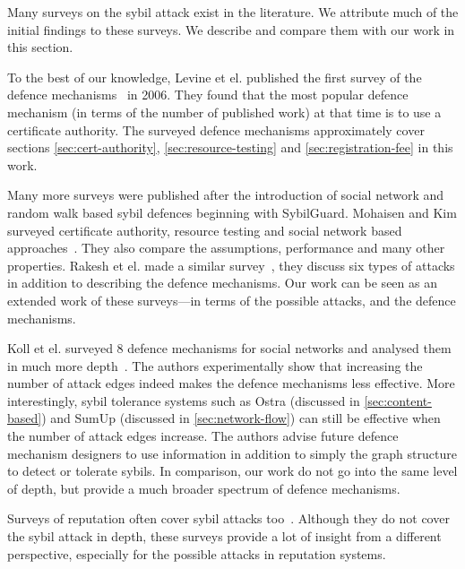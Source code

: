 Many surveys on the sybil attack exist in the literature. We attribute much of
the initial findings to these surveys. We describe and compare them with our
work in this section.

To the best of our knowledge, Levine et el. published the first survey of the
defence mechanisms~\cite{marti2006taxonomy} in 2006. They found that the most
popular defence mechanism (in terms of the number of published work) at that
time is to use a certificate authority. The surveyed defence mechanisms
approximately cover sections \ref{sec:cert-authority},
\ref{sec:resource-testing} and \ref{sec:registration-fee} in this work.

Many more surveys were published after the introduction of social network and
random walk based sybil defences beginning with SybilGuard. Mohaisen and Kim
surveyed certificate authority, resource testing and social network based
approaches~\cite{mohaisen2013sybil}. They also compare the assumptions,
performance and many other properties. Rakesh et el. made a similar
survey~\cite{rakesh2014survey}, they discuss six types of attacks in addition to
describing the defence mechanisms. Our work can be seen as an extended work of
these surveys---in terms of the possible attacks, and the defence mechanisms.

Koll et el. surveyed 8 defence mechanisms for social networks and analysed them
in much more depth~\cite{koll2014state}. The authors experimentally show that
increasing the number of attack edges indeed makes the defence mechanisms less
effective. More interestingly, sybil tolerance systems such as Ostra (discussed
in \autoref{sec:content-based}) and SumUp (discussed in
\autoref{sec:network-flow}) can still be effective when the number of attack
edges increase. The authors advise future defence mechanism designers to use
information in addition to simply the graph structure to detect or tolerate
sybils. In comparison, our work do not go into the same level of depth, but
provide a much broader spectrum of defence mechanisms.

Surveys of reputation often cover sybil attacks too~\cite{marti2006taxonomy,
  hoffman2009survey, koutrouli2012taxonomy, selvaraj2012survey}. Although they
do not cover the sybil attack in depth, these surveys provide a lot of insight
from a different perspective, especially for the possible attacks in reputation
systems.

